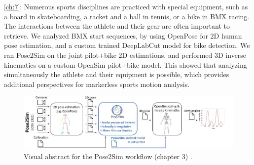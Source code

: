 \vspace*{0.2cm}
\noindent\autoref{ch:7}: Numerous sports disciplines are practiced with special equipment, such as a board in skateboarding, a racket and a ball in tennis, or a bike in BMX racing. The interactions between the athlete and their gear are often important to retrieve. We analyzed BMX start sequences, by using OpenPose for 2D human pose estimation, and a custom trained DeepLabCut model for bike detection. We ran Pose2Sim on the joint {pilot+bike} 2D estimations, and performed 3D inverse kinematics on a custom OpenSim {pilot+bike} model. This showed that analyzing simultaneously the athlete and their equipment is possible, which provides additional perspectives for markerless sports motion analysis. 


\begin{figure}[hbtp]
	\centering
            \def\svgwidth{1\columnwidth}
            \fontsize{10pt}{10pt}\selectfont
            \includegraphics[width=\linewidth]{"../Intro/Figures/Fig_VisAbstract1.JPG"}
            \caption{Visual abstract for the Pose2Sim workflow (chapter 3) \cite{Pagnon2022b}.}
            \label{fig_visabstract1_1}
\end{figure}

